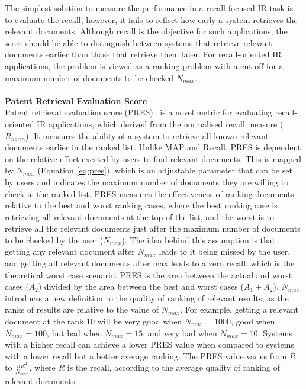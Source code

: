 The simplest solution to measure the performance in a recall focused IR task is to evaluate the recall, however, it fails to reflect how early a system retrieves the relevant documents. Although recall is the objective for such applications, the score should be able to distinguish between systems that retrieve relevant documents earlier than those that retrieve them later. For recall-oriented IR applications, the problem is viewed as a ranking problem with a cut-off for a maximum number of documents to be checked $ N_{max} $.\\\\
\textbf{Patent Retrieval Evaluation Score}
\ \\
Patent retrieval evaluation score (PRES)~\citep{magdy2010pres} is a novel metric for evaluating recall-oriented IR applications, which derived from the normalised recall measure ($ R_{norm} $). It measures the ability of a system to retrieve all known relevant documents earlier in the ranked list. Unlike MAP and Recall, PRES is dependent on the relative effort exerted by users to find relevant documents. This is mapped by $ N_{max} $ (Equation \ref{eq:pres}), which is an adjustable parameter that can be set by users and indicates the maximum number of documents they are willing to check in the ranked list. PRES measures the effectiveness of ranking documents relative to the best and worst ranking cases, where the best ranking case is retrieving all relevant documents at the top of the list, and the worst is to retrieve all the relevant documents just after the maximum number of documents to
be checked by the user ($ N_{max} $). The idea behind this assumption is that getting any relevant document after $ N_{max} $ leads to it being missed by the user, and getting all relevant documents after max leads to a zero recall, which is the theoretical worst case scenario. 
PRES is the area between the actual and worst cases ($ A_{2} $) divided by the area between the best and worst cases ($ A_{1}+A_{2} $).
$ N_{max} $ introduces a new definition to the quality of ranking of relevant results, as the ranks of results are relative to the value of $ N_{max} $. For example, getting a relevant document at the rank 10 will be very good when $ N_{max}=1000 $, good when $ N_{max}=100 $, but bad when $ N_{max}=15 $, and very bad when $ N_{max}=10 $. Systems with a higher recall can achieve a lower PRES value when compared to systems with a lower recall but a better average ranking. The PRES value varies from $ R $ to $ \frac{nR^{2}}{N_{max}} $, where $ R $ is the recall, according to the average quality of ranking of relevant documents.
